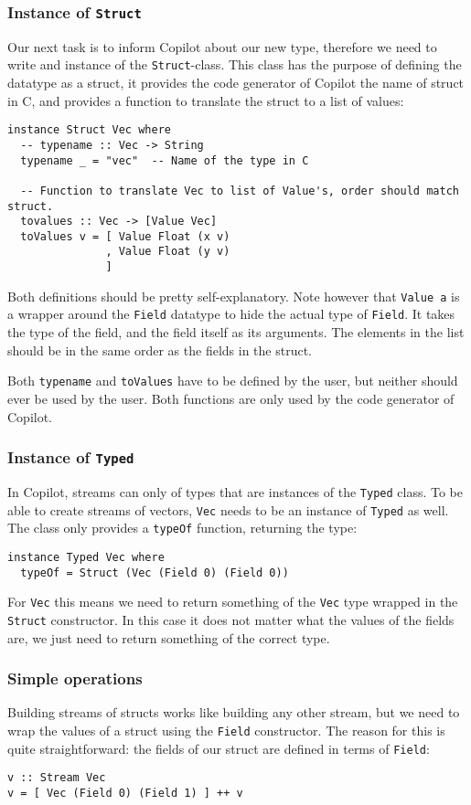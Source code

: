 \subsubsection*{Instance of \texttt{Struct}}
Our next task is to inform Copilot about our new type, therefore we need to
write and instance of the \texttt{Struct}-class. This class has the purpose of
defining the datatype as a struct, it provides the code generator of Copilot the
name of struct in C, and provides a function to translate the struct to a list
of values:
\begin{lstlisting}[language=Copilot]
instance Struct Vec where
  -- typename :: Vec -> String
  typename _ = "vec"  -- Name of the type in C

  -- Function to translate Vec to list of Value's, order should match struct.
  tovalues :: Vec -> [Value Vec]
  toValues v = [ Value Float (x v)
               , Value Float (y v)
               ]
\end{lstlisting}
Both definitions should be pretty self-explanatory. Note however that
\texttt{Value a} is a wrapper around the \texttt{Field} datatype to hide the
actual type of \texttt{Field}. It takes the type of the field, and the field
itself as its arguments. The elements in the list should be in the same order
as the fields in the struct.

Both \texttt{typename} and \texttt{toValues} have to be defined by the user,
but neither should ever be used by the user. Both functions are only used by
the code generator of Copilot.


\subsubsection*{Instance of \texttt{Typed}}
In Copilot, streams can only of types that are instances of the \texttt{Typed}
class. To be able to create streams of vectors, \texttt{Vec} needs to be an
instance of \texttt{Typed} as well. The class only provides a \texttt{typeOf}
function, returning the type:
\begin{lstlisting}[language=Copilot]
instance Typed Vec where
  typeOf = Struct (Vec (Field 0) (Field 0))
\end{lstlisting}
For \texttt{Vec} this means we need to return something of the \texttt{Vec}
type wrapped in the \texttt{Struct} constructor. In this case it does not
matter what the values of the fields are, we just need to return something of
the correct type.


\subsubsection*{Simple operations}
Building streams of structs works like building any other stream, but we need
to wrap the values of a struct using the \texttt{Field} constructor. The reason
for this is quite straightforward: the fields of our struct are defined in
terms of \texttt{Field}:
\begin{lstlisting}[language=Copilot]
v :: Stream Vec
v = [ Vec (Field 0) (Field 1) ] ++ v
\end{lstlisting}

